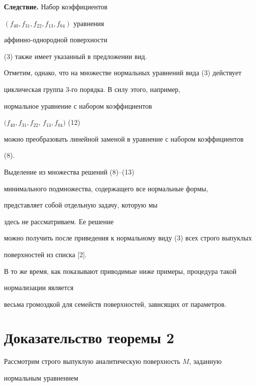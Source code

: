 




{\bf Следствие.} Набор коэффициентов


$(f_{40}, f_{31}, f_{22}, f_{13}, f_{04})$ уравнения


аффинно-однородной поверхности


(3) также имеет указанный в предложении вид.


\medskip





Отметим, однако, что на множестве нормальных уравнений вида (3) действует


циклическая группа 3-го порядка. В силу этого, например,


нормальное уравнение с набором коэффициентов


$(f_{40}, f_{31}, f_{22} $, $ f_{13}, f_{04})$ (12)


можно преобразовать линейной заменой в уравнение с набором коэффициентов


(8).





Выделение из множества решений (8)--(13)


минимального подмножества, содержащего все нормальные формы,


представляет собой отдельную задачу, которую мы


здесь не рассматриваем. Ее решение


можно получить после приведения к нормальному виду (3) всех строго выпуклых


поверхностей из списка [2].


В то же время, как показывают приводимые ниже примеры, процедура такой


нормализации является


весьма громоздкой для семейств поверхностей, зависящих от параметров.





\section{Доказательство теоремы 2}





Рассмотрим строго выпуклую аналитическую поверхность $M$, заданную


нормальным уравнением


